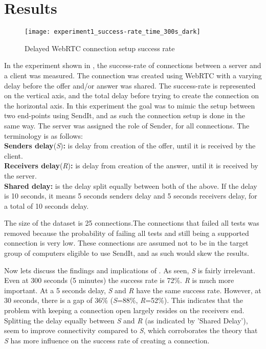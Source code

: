 \documentclass[runningheads]{llncs}
\begin{document}
\section{Results}
\label{sec:results}
%
\begin{figure}
  \texttt{[image: experiment1\_success-rate\_time\_300s\_dark]}
  \caption{Delayed WebRTC connection setup success rate} \label{fig:fig5}
\end{figure}
%
In the experiment shown in , the success-rate of connections between a server and a client was measured. The connection was created using WebRTC with a varying delay before the offer and/or answer was shared. The success-rate is represented on the vertical axis, and the total delay before trying to create the connection on the horizontal axis. In this experiment the goal was to mimic the setup between two end-points using SendIt, and as such the connection setup is done in the same way. The server was assigned the role of Sender, for all connections. The terminology is as follows:\\
{\bfseries Senders delay}(\textit{S}){\bfseries :} is delay from creation of the offer, until it is received by the client.\\
{\bfseries Receivers delay}(\textit{R}){\bfseries :} is delay from creation of the answer, until it is received by the server.\\
{\bfseries Shared delay:} is the delay split equally between both of the above. If the delay is 10 seconds, it means 5 seconds senders delay and 5 seconds receivers delay, for a total of 10 seconds delay.

The size of the dataset is 25 connections.The connections that failed all tests was removed because the probability of failing all tests and still being a supported connection is very low. These connections are assumed not to be in the target group of computers eligible to use SendIt, and as such would skew the results. 

Now lets discuss the findings and implications of . As seen, \textit{S} is fairly irrelevant. Even at 300 seconds (5 minutes) the success rate is 72\%. \textit{R} is much more important. At a 5 seconds delay, \textit{S} and \textit{R} have the same success rate. However, at 30 seconds, there is a gap of 36\% (\textit{S}=88\%, \textit{R}=52\%). This indicates that the problem with keeping a connection open largely resides on the receivers end. Splitting the delay equally between \textit{S} and \textit{R} (as indicated by 'Shared Delay'), seem to improve connectivity compared to \textit{S}, which corroborates the theory that \textit{S} has more influence on the success rate of creating a connection.
\end{document}
